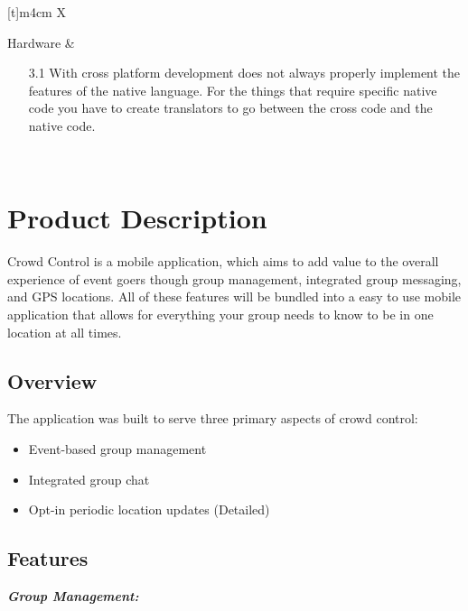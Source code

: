 \begin{center}
\begin{tabularx}{\textwidth}[t]{m{4cm} X}
\hline
{} \\
\hline

Hardware &
\begin{minipage}[t]{\linewidth}%
\begin{itemize}
\item[3.1] With cross platform development does not always properly implement the features of the native language. For the things that require specific native code you have to create translators to go between the cross code and the native code.
\end{itemize} 
\end{minipage}\\


\end{tabularx}
\end{center}

\section{Product Description}

Crowd Control is a mobile application, which aims to add value to the overall experience of event goers though group management, integrated group messaging, and GPS locations. All of these features will be bundled into a easy to use mobile application that allows for everything your group needs to know to be in one location at all times.

\subsection{Overview}

The application was built to serve three primary aspects of crowd control: 
\begin{itemize}
\item Event-based group management
\item Integrated group chat
\item Opt-in periodic location updates
         (Detailed)
\end{itemize}

\subsection{Features}

\textit{\textbf{Group Management:}}\\

